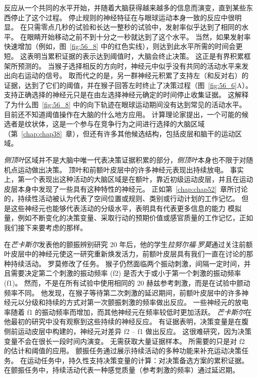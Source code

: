 反应从一个共同的水平开始，并随着大脑获得越来越多的信息而演变，直到某些东西停止了这个过程。
停止规则的神经特征在与眼球运动本身一致的反应中很明显。
在只需零点几秒的试验和长达一整秒的试验中，发射率似乎达到了相同的水平。
在眼睛开始移动之前不到十分之一秒就达到了这个水平。
当然，如果发射率快速增加（例如，图~\ref{fig:56_8} 中的红色实线），则达到此水平所需的时间会更短。 这表明当累积证据的表示达到阈值时，大脑会终止决策。
这正是有界积累框架所预测的。
当猴子选择相反的方向时，神经元中似乎没有共同的活动水平来发出向右运动的信号。
取而代之的是，另一群神经元积累了支持左（和反对右）的证据，达到了它们的阈值，并在猴子回答左时终止了决策过程（图~\ref{fig:56_6}A）。
支持正确选择的神经元只是在由左选择神经元确定的时间停止收集证据。
这解释了为什么图~\ref{fig:56_8} 中的向下轨迹在眼球运动期间没有达到常见的活动水平。
目前还不知道阈值操作在大脑的什么地方应用。
计算理论家提出，一个可能的候选者是纹状体，这是一个参与在竞争行为之间进行选择的大脑区域（第~\ref{chap:chap38}~章），但还有许多其他候选结构，包括皮层和脑干的运动区域。


\textit{侧顶叶}区域并不是大脑中唯一代表决策证据积累的部分，\textit{侧顶叶}本身也不限于对随机点运动做出决策。
顶叶和前额叶皮层中的许多神经元表现出持续放电。
事实上，第一个表现出这种活动的大脑区域是在额叶，靠近初级运动皮层，并且在运动皮层本身中发现了一些具有这种特性的神经元。
正如第~\ref{chap:chap52}~章所讨论的，持续性活动被认为代表了空间位置或规则、类别或行动计划的工作记忆。
但是这些神经元也能够代表活动的分级水平，表明具有代表更多信息的能力 模拟量，例如不断变化的决策变量、采取行动的预期价值或感官质量的工作记忆，正如我们接下来要考虑的那样。


在\textit{芒卡斯尔}发表他的颤振辨别研究 20 年后，他的学生\textit{拉努尔福$\cdot$罗莫}通过关注前额叶皮层中的神经元使这一研究重新焕发活力，前额叶皮层具有我们一直在讨论的那种持续活动。
罗莫修改了任务。
猴子仍然面临两个振动刺激，间隔一定时间，并且需要决定第二个刺激的振动频率 (f2) 是否大于或小于第一个刺激的振动频率 (f1)。
然而，不是在所有试验中使用相同的 20 赫兹参考刺激，而是在试验中颤动频率不同。
他发现，在猴子等待第二次刺激的延迟期间，前额叶皮层中的许多神经元以分级和持续的方式对第一次颤振刺激的频率做出反应。
一些神经元的放电率随着 f1 的振动频率而增加，而其他神经元在频率较低时更加活跃。
\textit{芒卡斯尔}在他最初的研究中没有观察到这些持续的神经反应。
有证据表明，决策变量是在腹侧前运动皮层中构建的，神经元对差异 f2 – f1 做出反应。
这很难研究，因为决策变量不会在很长一段时间内演变。 无需获取大量证据样本。
所需要的只是对 f2 的估计和阈值的应用。
颤振任务通过展示持续活动的多种功能来补充运动决策任务。
在运动任务中，持久性支持决策变量的计算：对决策备选方案的累积证据。
在颤振任务中，持续活动代表一种感觉质量（参考刺激的频率）通过延迟期。



